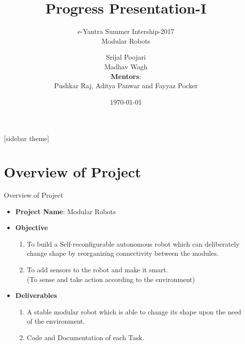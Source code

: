 \documentclass[10pt, a4paper]{beamer}
\begin{document}
	\title{Progress Presentation-I}
	\subtitle{e-Yantra Summer Intership-2017 \\ Modular Robots}
	\author{Srijal Poojari\\Madhav Wagh\\
	\textbf{Mentors}: \\
	 Pushkar Raj, Aditya Panwar and Fayyaz Pocker}
	\date{\today}
	\frame{\titlepage}

[sidebar theme]
\section{Overview of Project}
\begin{frame}{Overview of Project}
	\begin{itemize}
		\item \textbf{Project Name}:  Modular Robots
		\item \textbf{Objective} 
		\begin{enumerate}
		\item To build a Self-reconfigurable autonomous 	     		robot which can deliberately change shape by 				reorganizing connectivity between the modules.
		\linebreak
		\item To add sensors to the robot and make it smart. 		\\(To sense and take action according to the 				  environment)
		\linebreak
		\end{enumerate}
		\item \textbf{Deliverables}
		\begin{enumerate}
		 \item A stable modular robot which is able to 					  change its shape upon the need of the 					  environment.\linebreak
		\item Code and Documentation of each Task.
		\end{enumerate}
	\end{itemize}
\end{frame}
\end{document}
